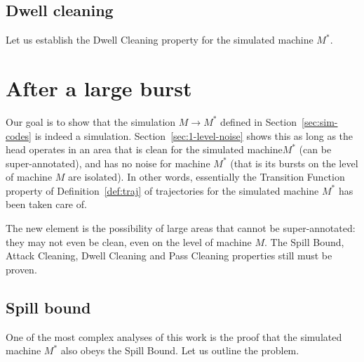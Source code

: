 \documentclass[12pt]{memoir}
\begin{document}
\subsection{Dwell cleaning}

Let us establish the Dwell Cleaning property for the simulated machine \( M^{*} \).




\section{After a large burst}

Our goal is to show that the simulation \( M\to M^{*} \)
defined in Section~\ref{sec:sim-codes} is indeed a simulation.
Section~\ref{sec:1-level-noise} shows this as long as the head operates in an
area that is clean for the simulated machine\( M^{*} \) (can be super-annotated), 
and has no noise for machine \( M^{*} \) (that is its bursts on the level of machine \( M \)
are isolated).
In other words, essentially the Transition Function property of Definition~\ref{def:traj} of
trajectories for the simulated machine \( M^{*} \) has been taken care of.

The new element is the possibility of large areas that cannot be super-annotated: they
may not even be clean, even on the level of machine \( M \).
The Spill Bound, Attack Cleaning, Dwell Cleaning and Pass Cleaning properties still must be proven.

\subsection{Spill bound}

One of the most complex analyses of this work is the proof that 
the simulated machine \( M^{*} \) also obeys the Spill Bound.
Let us outline the problem.
\end{document}
